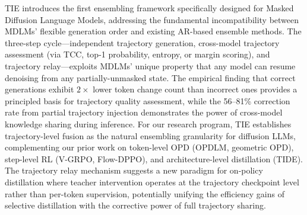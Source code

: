 \documentclass[11pt,a4paper]{article}
\begin{document}
TIE introduces the first ensembling framework specifically designed for Masked Diffusion Language Models, addressing the fundamental incompatibility between MDLMs' flexible generation order and existing AR-based ensemble methods. The three-step cycle---independent trajectory generation, cross-model trajectory assessment (via TCC, top-1 probability, entropy, or margin scoring), and trajectory relay---exploits MDLMs' unique property that any model can resume denoising from any partially-unmasked state. The empirical finding that correct generations exhibit $2\times$ lower token change count than incorrect ones provides a principled basis for trajectory quality assessment, while the 56--81\% correction rate from partial trajectory injection demonstrates the power of cross-model knowledge sharing during inference. For our research program, TIE establishes trajectory-level fusion as the natural ensembling granularity for diffusion LLMs, complementing our prior work on token-level OPD (OPDLM, geometric OPD), step-level RL (V-GRPO, Flow-DPPO), and architecture-level distillation (TIDE). The trajectory relay mechanism suggests a new paradigm for on-policy distillation where teacher intervention operates at the trajectory checkpoint level rather than per-token supervision, potentially unifying the efficiency gains of selective distillation with the corrective power of full trajectory sharing.
\end{document}
